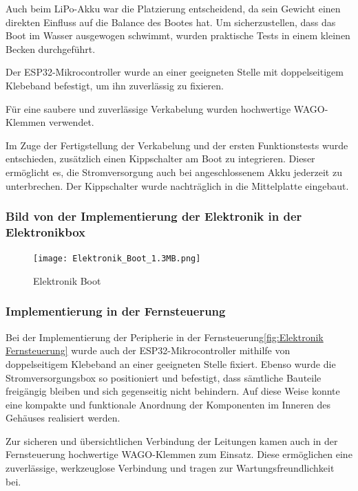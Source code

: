 \documentclass[a4paper,12pt]{article}
\begin{document}
Auch beim LiPo-Akku war die Platzierung entscheidend, da sein Gewicht einen direkten Einfluss auf die Balance des Bootes hat. Um sicherzustellen, dass das Boot im Wasser ausgewogen schwimmt, wurden praktische Tests in einem kleinen Becken durchgeführt.\newline

Der ESP32-Mikrocontroller wurde an einer geeigneten Stelle mit doppelseitigem Klebeband befestigt, um ihn zuverlässig zu fixieren.

Für eine saubere und zuverlässige Verkabelung wurden hochwertige WAGO-Klemmen verwendet.\newline

Im Zuge der Fertigstellung der Verkabelung und der ersten Funktionstests wurde entschieden, zusätzlich einen Kippschalter am Boot zu integrieren. Dieser ermöglicht es, die Stromversorgung auch bei angeschlossenem Akku jederzeit zu unterbrechen. Der Kippschalter wurde nachträglich in die Mittelplatte eingebaut.\newline

\subsubsection{Bild von der Implementierung der Elektronik in der Elektronikbox}

\begin{figure}[H]
    \centering
    \texttt{[image: Elektronik\_Boot\_1.3MB.png]}
    \caption{Elektronik Boot}
    \label{fig:Elektronik Boot}
\end{figure}



\subsubsection{Implementierung in der Fernsteuerung}


Bei der Implementierung der Peripherie in der Fernsteuerung\ref{fig:Elektronik Fernsteuerung} wurde auch der ESP32-Mikrocontroller mithilfe von doppelseitigem Klebeband an einer geeigneten Stelle fixiert. Ebenso wurde die Stromversorgungsbox so positioniert und befestigt, dass sämtliche Bauteile freigängig bleiben und sich gegenseitig nicht behindern. Auf diese Weise konnte eine kompakte und funktionale Anordnung der Komponenten im Inneren des Gehäuses realisiert werden.

Zur sicheren und übersichtlichen Verbindung der Leitungen kamen auch in der Fernsteuerung hochwertige WAGO-Klemmen zum Einsatz. Diese ermöglichen eine zuverlässige, werkzeuglose Verbindung und tragen zur Wartungsfreundlichkeit bei.
\end{document}
